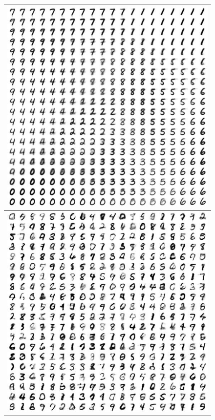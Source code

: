 \documentclass[letterpaper, twoside]{article}
\begin{document}
\begin{figure}[H]
\begin{minipage}{.33\textwidth}
\begin{tabular}{|@{}c@{}|}
\end{tabular}
\end{minipage}%
\begin{minipage}{.33\textwidth}
\begin{tabular}{|@{}c@{}|}
\includegraphics[scale=0.5]{manifold_32.jpg}\\ \hline
\includegraphics[scale=0.5]{manifold_33.jpg}\\ \hline

\end{tabular}
\end{minipage}
\end{figure}
\end{document}
